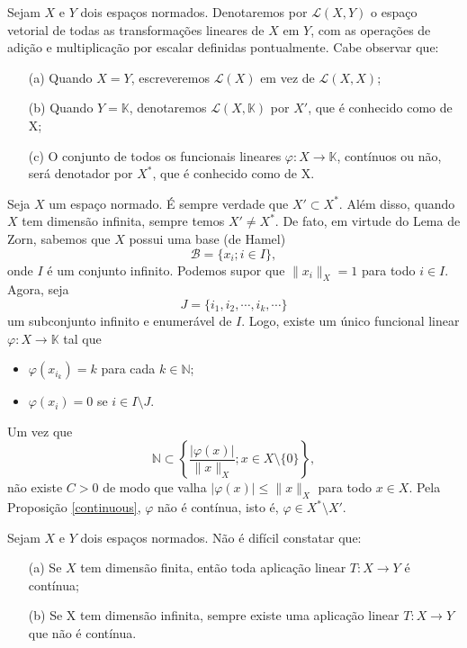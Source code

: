 \begin{definition}
    Sejam $X$ e $Y$ dois espaços normados. Denotaremos por $\mathcal L (X,Y)$ o espaço vetorial de todas as transformações lineares de $X$ em $Y$, com as operações de adição e multiplicação por escalar definidas pontualmente. Cabe observar que:
    \begin{itemize}
    \item[(a)] Quando $X=Y$, escreveremos $\mathcal L (X)$ em vez de $\mathcal L (X,X)$;
    \item[(b)] Quando $Y=\mathbb K$, denotaremos $\mathcal L (X,\mathbb K)$ por $X'$, que é conhecido como   de X;
    \item[(c)] O conjunto de todos os funcionais lineares $\varphi : X\longrightarrow \mathbb K$, contínuos ou não, será denotador por $X^{\ast}$, que é conhecido como   de X.
    \end{itemize}
\end{definition}

\begin{remark}
Seja $X$ um espaço normado. É sempre verdade que $X' \subset X^{\ast}$. Além disso, quando $X$ tem dimensão infinita, sempre temos $X'\neq X^{\ast}$. De fato, em virtude do Lema de Zorn, sabemos que $X$ possui uma base (de Hamel)
\[
\displaystyle \mathcal B = \{ x_i; i\in I\},
\]
onde $I$ é um conjunto infinito. Podemos supor que $\| x_i \|_X =1$ para todo $i\in I$. Agora, seja 
\[
\displaystyle J = \{ i_1, i_2, \cdots , i_k, \cdots \}
\]
um subconjunto infinito e enumerável de $I$. Logo, existe um único funcional linear $\varphi : X \longrightarrow \mathbb K$ tal que 
\begin{itemize}
\item $\varphi (x_{i_k})=k$ para cada $k\in \mathbb N$;
\item $\varphi (x_i)=0$ se $i\in I\setminus J$.
\end{itemize}
Um vez que 
\[
\displaystyle \mathbb N \subset \left\{ \frac{|\varphi (x)|}{\|x\|_{X}}; x\in X\setminus \{0\}\right\},
\]
não existe $C>0$ de modo que valha $|\varphi (x)|\leq \|x\|_X$ para todo $x\in X$. Pela Proposição \ref{continuous}, $\varphi$ não é contínua, isto é, $\varphi \in X^{\ast} \setminus X'$.
\end{remark}

\begin{remark}
Sejam $X$ e $Y$ dois espaços normados. Não é difícil constatar que:
\begin{itemize}
\item[(a)] Se $X$ tem dimensão finita, então toda aplicação linear $T:X\longrightarrow Y$ é contínua;
\item[(b)] Se X tem dimensão infinita, sempre existe uma aplicação linear $T:X\longrightarrow Y$ que não é contínua.
\end{itemize}
\end{remark}

